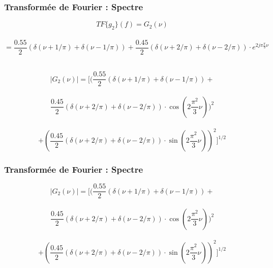 \documentclass{beamer}
\begin{document}
\begin{frame}
\frametitle{Transformée  de Fourier : Spectre}

\[ TF\{ g_2 \}(f) = G_2(\nu)\]\\
\[ =   \frac{0.55}{2}(\delta(\nu+1/\pi) + \delta(\nu-1/\pi)) + \frac{0.45}{2}(\delta(\nu+2/\pi) + \delta(\nu-2/\pi)) \cdot e^{2 j \pi \frac{\pi}{3} \nu }\]\\

\vspace{0.5 cm}

\[|G_2(\nu)| = \bigl[(\frac{0.55}{2}(\delta(\nu+1/\pi) + \delta(\nu-1/\pi))+ \] \\
\[ \frac{0.45}{2}(\delta(\nu+2/\pi) + \delta(\nu-2/\pi)) \cdot  \cos(2\frac{\pi^2}{3} \nu))^2 \]\\
\[+(\frac{0.45}{2}(\delta(\nu+2/\pi) + \delta(\nu-2/\pi)) \cdot  \sin(2\frac{\pi^2}{3} \nu))^2 \bigr] ^{1/2} \]

\end{frame}

\begin{frame} 
\frametitle{Transformée  de Fourier : Spectre}

\[|G_2(\nu)| = \bigl[(\frac{0.55}{2}(\delta(\nu+1/\pi) + \delta(\nu-1/\pi))+ \] \\
\[ \frac{0.45}{2}(\delta(\nu+2/\pi) + \delta(\nu-2/\pi)) \cdot  \cos(2\frac{\pi^2}{3} \nu))^2 \]\\
\[+(\frac{0.45}{2}(\delta(\nu+2/\pi) + \delta(\nu-2/\pi)) \cdot  \sin(2\frac{\pi^2}{3} \nu))^2 \bigr] ^{1/2} \]\\

\vspace{0.5cm}
\end{frame}
\end{document}
